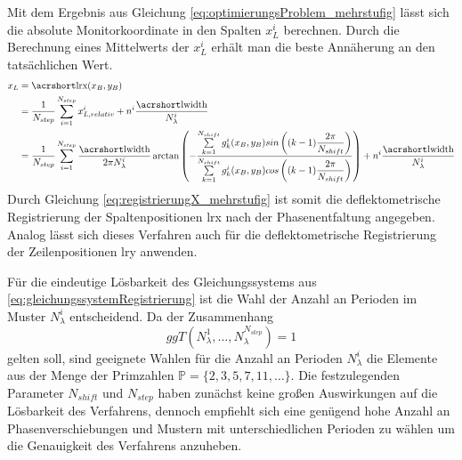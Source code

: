 %
{
	\FloatBarrier
	
}
%
Mit dem Ergebnis aus Gleichung \ref{eq:optimierungsProblem_mehrstufig} lässt sich die absolute Monitorkoordinate in den Spalten $x_L^i$ berechnen.
Durch die Berechnung eines Mittelwerts der $x_L^i$ erhält man die beste Annäherung an den tatsächlichen Wert.
%
\begin{equation}\label{eq:registrierungX_mehrstufig}
	\begin{split}
		x_L
		& =
			\acrshortmath{lrx}(x_B, y_B)\\
		& =
			\dfrac{1}{N_{step}}
			\sum\limits_{i = 1}^{N_{step}}
			x_{L,relativ}^i + n^i \dfrac{\acrshortmath{lwidth}}{N_\lambda^i}\\
		& =
			\dfrac{1}{N_{step}}
			\sum\limits_{i = 1}^{N_{step}}
			\dfrac{\acrshortmath{lwidth}}{2\pi N_\lambda^i}
			\arctan
			\left(
				-\dfrac
				{\sum\limits_{k=1}^{N_{shift}} g_k^i(x_B, y_B) sin\left((k - 1)\dfrac{2\pi}{N_{shift}}\right)}
				{\sum\limits_{k=1}^{N_{shift}} g_k^i(x_B, y_B) cos\left((k - 1)\dfrac{2\pi}{N_{shift}}\right)}
			\right)
			+ n^i \dfrac{\acrshortmath{lwidth}}{N_\lambda^i}
	\end{split}
\end{equation}
%
Durch Gleichung \ref{eq:registrierungX_mehrstufig} ist somit die deflektometrische Registrierung der Spaltenpositionen \acrshort{lrx} nach der Phasenentfaltung angegeben.
Analog lässt sich dieses Verfahren auch für die deflektometrische Registrierung der Zeilenpositionen \acrshort{lry} anwenden.

\p
Für die eindeutige Lösbarkeit des Gleichungssystems aus \ref{eq:gleichungssystemRegistrierung} ist die Wahl der Anzahl an Perioden im Muster $N_\lambda^i$ entscheidend.
Da der Zusammenhang
%
\begin{equation*}
	ggT(N_\lambda^1, \ldots, N_\lambda^{N_{step}}) = 1
\end{equation*}
%
gelten soll, sind geeignete Wahlen für die Anzahl an Perioden $N_\lambda^i$ die Elemente aus der Menge der Primzahlen $\mathbb{P} = \lbrace 2, 3, 5, 7, 11,\ldots\rbrace$.
Die festzulegenden Parameter $N_{shift}$ und $N_{step}$ haben zunächst keine großen Auswirkungen auf die Lösbarkeit des Verfahrens, dennoch empfiehlt sich eine genügend hohe Anzahl an Phasenverschiebungen und Mustern mit unterschiedlichen Perioden zu wählen um die Genauigkeit des Verfahrens anzuheben.


